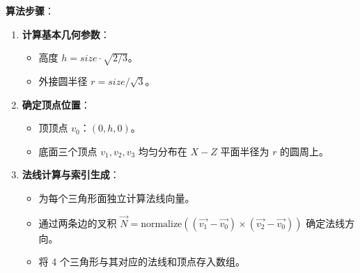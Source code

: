 \documentclass[12pt,a4paper]{article}
\begin{document}
\begin{tcolorbox}
\textbf{算法步骤}：
\begin{enumerate}
    \item \textbf{计算基本几何参数}：
    \begin{itemize}
        \item 高度 $h = size \cdot \sqrt{2/3}$。
        \item 外接圆半径 $r = size / \sqrt{3}$。
    \end{itemize}
    \item \textbf{确定顶点位置}：
    \begin{itemize}
        \item 顶顶点 $v_0$：$(0, h, 0)$。
        \item 底面三个顶点 $v_1, v_2, v_3$ 均匀分布在 $X-Z$ 平面半径为 $r$ 的圆周上。
    \end{itemize}
    \item \textbf{法线计算与索引生成}：
    \begin{itemize}
        \item 为每个三角形面独立计算法线向量。
        \item 通过两条边的叉积 $\vec{N} = \text{normalize}((\vec{v_1} - \vec{v_0}) \times (\vec{v_2} - \vec{v_0}))$ 确定法线方向。
        \item 将 4 个三角形与其对应的法线和顶点存入数组。
    \end{itemize}
\end{enumerate}
\end{tcolorbox}
\end{document}
